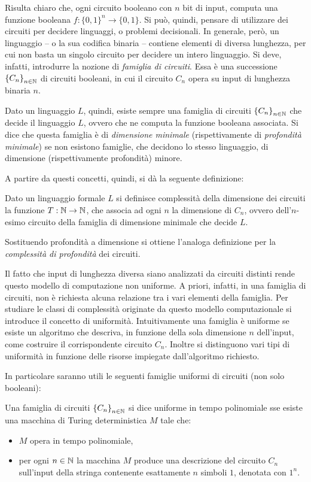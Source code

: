 Risulta chiaro che, ogni circuito booleano con $n$ bit di input, computa una funzione booleana $f:\{0,1\}^n \to \{0,1\}$.
Si può, quindi, pensare di utilizzare dei circuiti per decidere linguaggi, o problemi decisionali.
In generale, però, un linguaggio -- o la sua codifica binaria -- contiene elementi di diversa lunghezza, per cui non basta un singolo circuito per decidere un intero linguaggio.
Si deve, infatti, introdurre la nozione di \textit{famiglia di circuiti}. 
Essa è una successione $\left\{ C_n \right\}_{n \in \mathbb{N}}$ di circuiti booleani, in cui il circuito $C_n$ opera su input di lunghezza binaria $n$.

Dato un linguaggio $L$, quindi, esiste sempre una famiglia di circuiti $\left\{ C_n \right\}_{n \in \mathbb{N}}$ che decide il linguaggio $L$, ovvero che ne computa la funzione booleana associata.
Si dice che questa famiglia è di \textit{dimensione minimale} (rispettivamente di \textit{profondità minimale}) se non esistono famiglie, che decidono lo stesso linguaggio, di dimensione (rispettivamente profondità) minore.

A partire da questi concetti, quindi, si dà la seguente definizione:
\begin{defn}
 Dato un linguaggio formale $L$ si definisce {\upshape complessità della dimensione} dei circuiti la funzione $T: \mathbb{N} \to \mathbb{N}$, che associa ad ogni $n$ la dimensione di $C_n$, ovvero dell'$n$-esimo circuito della famiglia di dimensione minimale che decide $L$.
\end{defn}
Sostituendo profondità a dimensione si ottiene l'analoga definizione per la \textit{complessità di profondità} dei circuiti.

Il fatto che input di lunghezza diversa siano analizzati da circuiti distinti rende questo modello di computazione non uniforme.
A priori, infatti, in una famiglia di circuiti, non è richiesta alcuna relazione tra i vari elementi della famiglia.
Per studiare le classi di complessità originate da questo modello computazionale si introduce il concetto di uniformità.
Intuitivamente una famiglia è uniforme se esiste un algoritmo che descriva, in funzione della sola dimensione $n$ dell'input, come costruire il corrispondente circuito $C_n$.
Inoltre si distinguono vari tipi di uniformità in funzione delle risorse impiegate dall'algoritmo richiesto.

In particolare saranno utili le seguenti famiglie uniformi di circuiti (non solo booleani):
\begin{defn}\label{defn:Unif_family}
 Una famiglia di circuiti $\left\{ C_n \right\}_{n \in \mathbb{N}}$ si dice {\upshape uniforme in tempo polinomiale} sse esiste una macchina di Turing deterministica $M$ tale che:
 \begin{itemize}
  \item $M$ opera in tempo polinomiale,
  \item per ogni $n \in \mathbb{N}$ la macchina $M$ produce una descrizione del circuito $C_n$ sull'input della stringa contenente esattamente $n$ simboli $1$, denotata con $1^n$.
 \end{itemize}
\end{defn}

